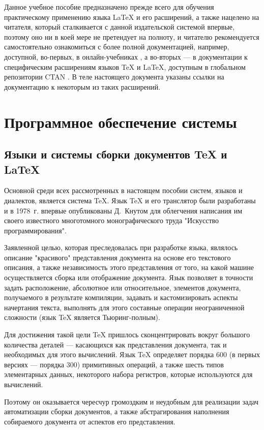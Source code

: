 \documentclass[workbook]{fefudoc}
\begin{document}
Данное учебное пособие предназначено прежде всего для обучения практическому применению языка \LaTeX{} и его расширений, а также нацелено на читателя, который сталкивается с данной издательской системой впервые, поэтому оно ни в коей мере не претендует на полноту, и читателю рекомендуется самостоятельно ознакомиться с более полной документацией, например, доступной, во-первых, в онлайн-учебниках \cite{latex-wikibooks, latex-overleaf}, а во-вторых --- в документации к специфическим расширениям языков \TeX{} и \LaTeX{}, доступным в глобальном репозитории CTAN \cite{CTAN}.
В теле настоящего документа указаны ссылки на документацию к некоторым из таких расширений.

\chapter{Программное обеспечение системы}
\section{Языки и системы сборки документов \TeX{} и \LaTeX{}}
Основной среди всех рассмотренных в настоящем пособии систем, языков и диалектов, является система \TeX{}.
Язык \TeX{} и его транслятор были разработаны и в 1978~г. впервые опубликованы Д.~Кнутом для облегчения написания им своего известного многотомного монографического труда "Искусство программирования".

Заявленной целью, которая преследовалась при разработке языка, являлось описание "красивого" \cite{TheTexBook} представления документа на основе его текстового описания, а также независимость этого представления от того, на какой машине осуществляется сборка или отображение документа.
Язык позволяет в точности задать расположение, абсолютное или относительное, элементов документа, получаемого в результате компиляции, задавать и кастомизировать аспекты начертания текста, выполнять для этого составные операции неограниченной сложности (язык \TeX{} является Тьюринг-полным).

Для достижения такой цели \TeX{} пришлось сконцентрировать вокруг большого количества деталей --- касающихся как представления документа, так и необходимых для этого вычислений.
Язык \TeX{} определяет порядка 600 (в первых версиях --- порядка 300) примитивных операций, а также шесть типов элементарных данных, некоторого набора регистров, которые используются для вычислений.

Поэтому он оказывается чересчур громоздким и неудобным для реализации задач автоматизации сборки документов, а также абстрагирования наполнения собираемого документа от аспектов его представления.
\end{document}
